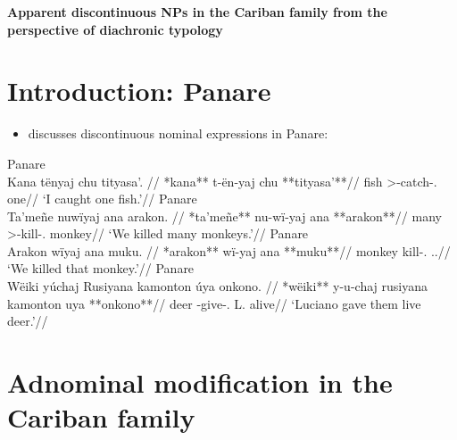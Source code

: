\documentclass[10pt]{article}
\begin{document}
\begin{center}
\Large \bfseries {Apparent discontinuous NPs in the Cariban family from the perspective of diachronic typology}
\end{center}

\section{Introduction: Panare}

\begin{itemize}
\tightlist
\item
  \textcites{payne1993nonconfigurationality} discusses discontinuous
  nominal expressions in Panare:
\end{itemize}

\pex\label{}    \a Panare\\
    \label{pan-0}        \begingl
        \glpreamble Kana tënyaj chu tityasa’. //
        \gla **kana** t-ën-yaj chu **tityasa’**//
        \glb fish >-catch-.  one//
            \glft ‘I caught one fish.’//  
        \endgl 
    \a Panare\\
    \label{pan-1}        \begingl
        \glpreamble Ta’meñe nuwïyaj ana arakon. //
        \gla **ta’meñe** nu-wï-yaj ana **arakon**//
        \glb many >-kill-.  monkey//
            \glft ‘We killed many monkeys.’//  
        \endgl 
    \a Panare\\
    \label{pan-2}        \begingl
        \glpreamble Arakon wïyaj ana muku. //
        \gla **arakon** wï-yaj ana **muku**//
        \glb monkey kill-.  ..//
            \glft ‘We killed that monkey.’//  
        \endgl 
    \a Panare\\
    \label{pan-3}        \begingl
        \glpreamble Wëiki yúchaj Rusiyana kamonton úya onkono. //
        \gla **wëiki** y-u-chaj rusiyana kamonton uya **onkono**//
        \glb deer -give-. L.   alive//
            \glft ‘Luciano gave them live deer.’//  
        \endgl 
\xe

\section{Adnominal modification in the Cariban family}
\end{document}
